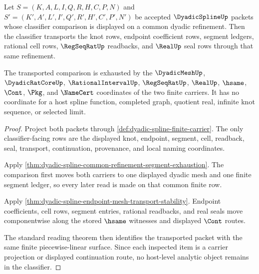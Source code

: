 \begin{theorem}
\label{thm:dyadic-spline-refinement-classifier-transport}
Let $S=(K,A,L,I,Q,R,H,C,P,N)$ and $S'=(K',A',L',I',Q',R',H',C',P',N')$ be accepted $\DyadicSplineUp$ packets whose classifier comparison is displayed on a common dyadic refinement. Then the classifier transports the knot rows, endpoint coefficient rows, segment ledgers, rational cell rows, $\RegSeqRatUp$ readbacks, and $\RealUp$ seal rows through that same refinement.

The transported comparison is exhausted by the $\DyadicMeshUp$, $\DyadicRatCoreUp$, $\RationalIntervalUp$, $\RegSeqRatUp$, $\RealUp$, $\hsame$, $\Cont$, $\Pkg$, and $\NameCert$ coordinates of the two finite carriers. It has no coordinate for a host spline function, completed graph, quotient real, infinite knot sequence, or selected limit.
\end{theorem}
\begin{proof}
Project both packets through \autoref{def:dyadic-spline-finite-carrier}. The only classifier-facing rows are the displayed knot, endpoint, segment, cell, readback, seal, transport, continuation, provenance, and local naming coordinates.

Apply \autoref{thm:dyadic-spline-common-refinement-segment-exhaustion}. The comparison first moves both carriers to one displayed dyadic mesh and one finite segment ledger, so every later read is made on that common finite row.

Apply \autoref{thm:dyadic-spline-endpoint-mesh-transport-stability}. Endpoint coefficients, cell rows, segment entries, rational readbacks, and real seals move componentwise along the stored $\hsame$ witnesses and displayed $\Cont$ routes.

The standard reading theorem then identifies the transported packet with the same finite piecewise-linear surface. Since each inspected item is a carrier projection or displayed continuation route, no host-level analytic object remains in the classifier.
\end{proof}

